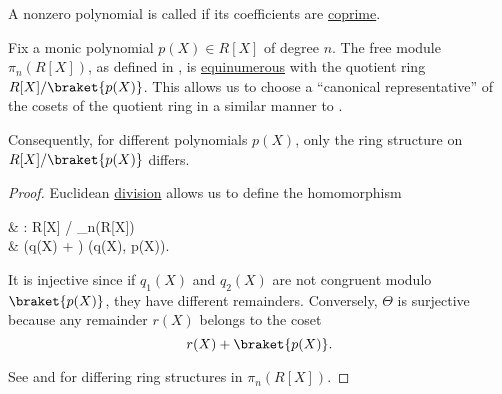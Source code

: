 \begin{definition}\label{def:primitive_polynomial}\mcite\cite[394]{Knapp2016BasicAlgebra}
  A nonzero polynomial is called  if its coefficients are \hyperref[def:coprime_ring_ideals]{coprime}.
\end{definition}

\begin{proposition}\label{thm:polynomial_quotient_rings_equinumerous_with_module_of_polynomials}
  Fix a monic polynomial \( p(X) \in R[X] \) of degree \( n \). The free module \( \pi_n(R[X]) \), as defined in , is \hyperref[def:equinumerous_sets]{equinumerous} with the quotient ring \( R[X] / \braket{p(X)} \). This allows us to choose a \enquote{canonical representative} of the cosets of the quotient ring in a similar manner to .

  Consequently, for different polynomials \( p(X) \), only the ring structure on \( R[X] / \braket{p(X)} \) differs.
\end{proposition}
\begin{proof}
  Euclidean \hyperref[thm:euclidean_division_of_polynomials]{division} allows us to define the homomorphism
  \begin{balign*}
     & \Theta: R[X] /  \to \pi_n(R[X])             \\
     & \Theta(q(X) + ) \coloneqq \rem(q(X), p(X)).
  \end{balign*}

  It is injective since if \( q_1(X) \) and \( q_2(X) \) are not congruent modulo \( \braket{p(X)} \), they have different remainders. Conversely, \( \Theta \) is surjective because any remainder \( r(X) \) belongs to the coset
  \begin{equation*}
    r(X) + \braket{p(X)}.
  \end{equation*}

  See  and  for differing ring structures in \( \pi_n(R[X]) \).
\end{proof}

